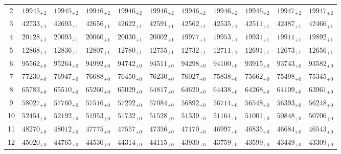 \documentclass[10pt, a4paper]{article}
\begin{document}
\begin{center}
\begin{tabular}{c || c c c c c | c c c c c}
        2 & \({19945}_{+2}\) & \({19945}_{+2}\) & \({19946}_{+2}\) & \({19946}_{+2}\) & \({19946}_{+2}\) & \({19946}_{+2}\) & \({19946}_{+2}\) & \({19946}_{+2}\) & \({19947}_{+2}\) & \({19947}_{+2}\)\\
        3 & \({42733}_{+1}\) & \({42693}_{+1}\) & \({42656}_{+1}\) & \({42622}_{+1}\) & \({42591}_{+1}\) & \({42562}_{+1}\) & \({42535}_{+1}\) & \({42511}_{+1}\) & \({42487}_{+1}\) & \({42466}_{+1}\)\\
        4 & \({20128}_{+1}\) & \({20093}_{+1}\) & \({20060}_{+1}\) & \({20030}_{+1}\) & \({20002}_{+1}\) & \({19977}_{+1}\) & \({19953}_{+1}\) & \({19931}_{+1}\) & \({19911}_{+1}\) & \({19892}_{+1}\)\\
        5 & \({12868}_{+1}\) & \({12836}_{+1}\) & \({12807}_{+1}\) & \({12780}_{+1}\) & \({12755}_{+1}\) & \({12732}_{+1}\) & \({12711}_{+1}\) & \({12691}_{+1}\) & \({12673}_{+1}\) & \({12656}_{+1}\)\\
        \hline
        6 & \({95562}_{+0}\) & \({95264}_{+0}\) & \({94992}_{+0}\) & \({94742}_{+0}\) & \({94511}_{+0}\) & \({94298}_{+0}\) & \({94100}_{+0}\) & \({93915}_{+0}\) & \({93743}_{+0}\) & \({93582}_{+0}\)\\
        7 & \({77230}_{+0}\) & \({76947}_{+0}\) & \({76688}_{+0}\) & \({76450}_{+0}\) & \({76230}_{+0}\) & \({76027}_{+0}\) & \({75838}_{+0}\) & \({75662}_{+0}\) & \({75498}_{+0}\) & \({75345}_{+0}\)\\
        8 & \({65783}_{+0}\) & \({65510}_{+0}\) & \({65260}_{+0}\) & \({65029}_{+0}\) & \({64817}_{+0}\) & \({64620}_{+0}\) & \({64438}_{+0}\) & \({64268}_{+0}\) & \({64109}_{+0}\) & \({63961}_{+0}\)\\
        9 & \({58027}_{+0}\) & \({57760}_{+0}\) & \({57516}_{+0}\) & \({57292}_{+0}\) & \({57084}_{+0}\) & \({56892}_{+0}\) & \({56714}_{+0}\) & \({56548}_{+0}\) & \({56393}_{+0}\) & \({56248}_{+0}\)\\
        10 & \({52454}_{+0}\) & \({52192}_{+0}\) & \({51953}_{+0}\) & \({51732}_{+0}\) & \({51528}_{+0}\) & \({51339}_{+0}\) & \({51164}_{+0}\) & \({51001}_{+0}\) & \({50848}_{+0}\) & \({50706}_{+0}\)\\
        \hline
        11 & \({48270}_{+0}\) & \({48012}_{+0}\) & \({47775}_{+0}\) & \({47557}_{+0}\) & \({47356}_{+0}\) & \({47170}_{+0}\) & \({46997}_{+0}\) & \({46835}_{+0}\) & \({46684}_{+0}\) & \({46543}_{+0}\)\\
        12 & \({45020}_{+0}\) & \({44765}_{+0}\) & \({44530}_{+0}\) & \({44314}_{+0}\) & \({44115}_{+0}\) & \({43930}_{+0}\) & \({43759}_{+0}\) & \({43599}_{+0}\) & \({43449}_{+0}\) & \({43309}_{+0}\)\\

\end{tabular}
\end{center}
\end{document}
